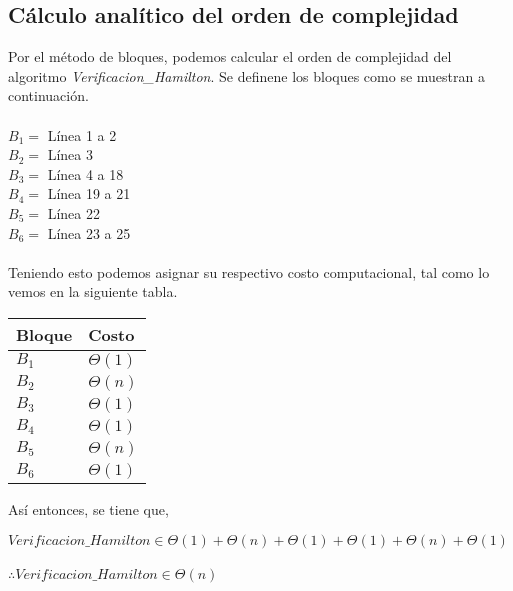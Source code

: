 \documentclass[12pt,twoside]{article}
\begin{document}
\subsection{Cálculo analítico del orden de complejidad}
Por el método de bloques, podemos calcular el orden de complejidad del algoritmo \textit{Verificacion\_Hamilton}. Se definene los bloques como se muestran a continuación.
\\\\
$B_1 =$ Línea 1 a 2\\
$B_2 =$ Línea 3\\
$B_3 =$ Línea 4 a 18\\
$B_4 =$ Línea 19 a 21\\
$B_5 =$ Línea 22\\
$B_6 =$ Línea 23 a 25\\\\
Teniendo esto podemos asignar su respectivo costo computacional, tal como lo vemos en la siguiente tabla.
\begin{center}
    \begin{tabular}{|l|l|}
    \hline
    Bloque & Costo\\
    \hline
    $B_{1}$ &$\Theta(1)$\\
    \hline
    $B_{2}$ & $\Theta(n)$ \\
    \hline
    $B_{3}$ &$\Theta(1)$\\
    \hline
    $B_{4}$ & $\Theta(1)$\\
    \hline
    $B_{5}$ & $\Theta(n)$\\
    \hline
    $B_{6}$ & $\Theta(1)$\\
    \hline
    \end{tabular}
\end{center}
Así entonces, se tiene que,
\begin{center}
    $Verificacion\_Hamilton \in \Theta(1) + \Theta(n) + \Theta(1) + \Theta(1) + \Theta(n) + \Theta(1)$\\\\
    $\therefore Verificacion\_Hamilton \in \Theta(n)$
\end{center}
\end{document}
